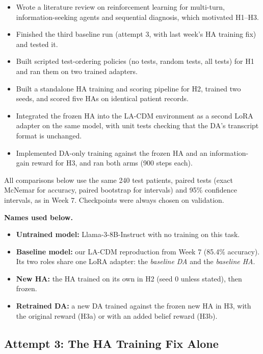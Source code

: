 \documentclass[11pt]{article}
\begin{document}
\begin{itemize}
  \item Wrote a literature review on reinforcement learning for multi-turn,
        information-seeking agents and sequential diagnosis, which motivated
        H1--H3.
  \item Finished the third baseline run (attempt 3, with last week's HA
        training fix) and tested it.
  \item Built scripted test-ordering policies (no tests, random tests, all
        tests) for H1 and ran them on two trained adapters.
  \item Built a standalone HA training and scoring pipeline for H2, trained two
        seeds, and scored five HAs on identical patient records.
  \item Integrated the frozen HA into the LA-CDM environment as a second LoRA
        adapter on the same model, with unit tests checking that the DA's
        transcript format is unchanged.
  \item Implemented DA-only training against the frozen HA and an
        information-gain reward for H3, and ran both arms (900 steps each).
\end{itemize}

All comparisons below use the same 240 test patients, paired tests (exact
McNemar for accuracy, paired bootstrap for intervals) and 95\% confidence
intervals, as in Week 7. Checkpoints were always chosen on validation.

\textbf{Names used below.}
\begin{itemize}
  \item \textbf{Untrained model:} Llama-3-8B-Instruct with no training on this
        task.
  \item \textbf{Baseline model:} our LA-CDM reproduction from Week 7 (85.4\%
        accuracy). Its two roles share one LoRA adapter: the \emph{baseline DA}
        and the \emph{baseline HA}.
  \item \textbf{New HA:} the HA trained on its own in H2 (seed 0 unless
        stated), then frozen.
  \item \textbf{Retrained DA:} a new DA trained against the frozen new HA in
        H3, with the original reward (H3a) or with an added belief reward (H3b).
\end{itemize}

\subsection*{Attempt 3: The HA Training Fix Alone}
\end{document}
